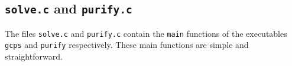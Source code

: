 \documentclass[12pt]{article}
\theoremstyle{definition}
\begin{document}
\begin{appendix}
\subsection{\texttt{solve.c} and  \texttt{purify.c}}

The files \texttt{solve.c} and \texttt{purify.c} contain the
\texttt{main} functions of the executables \texttt{gcps} and
\texttt{purify} respectively.  These main functions are
simple and straightforward.

\end{appendix}
\end{document}
